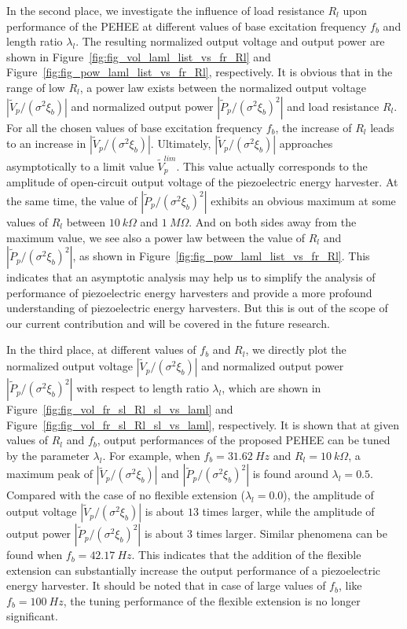 \documentclass{elsarticle}
\begin{document}
In the second place, we investigate the influence of load resistance $R_l$ upon performance of the PEHEE at different values of base excitation frequency $f_b$ and length ratio $\lambda_l$. The resulting normalized output voltage and output power are shown in Figure~\ref{fig:fig_vol_laml_list_vs_fr_Rl} and Figure~\ref{fig:fig_pow_laml_list_vs_fr_Rl}, respectively. It is obvious that in the range of low $R_l$, a power law exists between the normalized output voltage $|\tilde{V}_p/(\sigma^2 \xi_b)|$ and normalized output power $|\tilde{P}_p/(\sigma^2 \xi_b)^2|$ and load resistance $R_l$. For all the chosen values of base excitation frequency $f_b$, the increase of $R_l$ leads to an increase in $|\tilde{V}_p/(\sigma^2 \xi_b)|$. Ultimately, $|\tilde{V}_p/(\sigma^2 \xi_b)|$ approaches asymptotically to a limit value $\tilde{V}_p^{lim}$. This value actually corresponds to the amplitude of open-circuit output voltage of the piezoelectric energy harvester. At the same time, the value of $|\tilde{P}_p/(\sigma^2 \xi_b)^2|$ exhibits an obvious maximum at some values of $R_l$ between $10\ k\Omega$ and $1\ M\Omega$. And on both sides away from the maximum value, we see also a power law between the value of $R_l$ and $|\tilde{P}_p/(\sigma^2 \xi_b)^2|$, as shown in Figure~\ref{fig:fig_pow_laml_list_vs_fr_Rl}. This indicates that an asymptotic analysis may help us to simplify the analysis of performance of piezoelectric energy harvesters and provide a more profound understanding of piezoelectric energy harvesters. But this is out of the scope of our current contribution and will be covered in the future research.


In the third place, at different values of $f_b$ and $R_l$, we directly plot the normalized output voltage $|\tilde{V}_p/(\sigma^2 \xi_b)|$ and normalized output power $|\tilde{P}_p/(\sigma^2 \xi_b)^2|$ with respect to length ratio $\lambda_l$, which are shown in Figure~\ref{fig:fig_vol_fr_sl_Rl_sl_vs_laml} and Figure~\ref{fig:fig_vol_fr_sl_Rl_sl_vs_laml}, respectively. It is shown that at given values of $R_l$ and $f_b$, output performances of the proposed PEHEE can be tuned by the parameter $\lambda_l$. For example, when $f_b = 31.62\ Hz$ and $R_l = 10\ k\Omega$, a maximum peak of $|\tilde{V}_p/(\sigma^2 \xi_b)|$ and $|\tilde{P}_p/(\sigma^2 \xi_b)^2|$ is found around $\lambda_l = 0.5$. Compared with the case of no flexible extension ($\lambda_l = 0.0$), the amplitude of output voltage $|\tilde{V}_p/(\sigma^2 \xi_b)|$ is about $13$ times larger, while the amplitude of output power $|\tilde{P}_p/(\sigma^2 \xi_b)^2|$ is about $3$ times larger. Similar phenomena can be found when $f_b = 42.17\ Hz$. This indicates that the addition of the flexible extension can substantially increase the output performance of a piezoelectric energy harvester. It should be noted that in  case of large values of $f_b$, like $f_b = 100\ Hz$, the tuning performance of the flexible extension is no longer significant.
\end{document}
